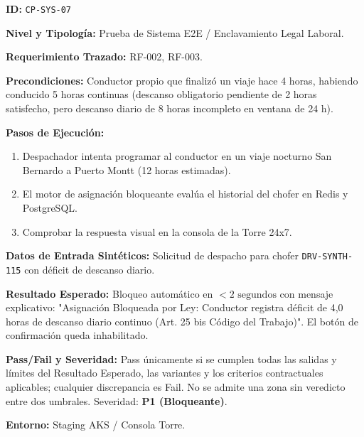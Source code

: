 \par\noindent\textbf{ID:} \texttt{C\allowbreak{}P\allowbreak{}-\allowbreak{}S\allowbreak{}Y\allowbreak{}S\allowbreak{}-\allowbreak{}0\allowbreak{}7\allowbreak{}}\par
\par\noindent\textbf{Nivel y Tipología:} Prueba de Sistema E2E / Enclavamiento Legal Laboral.\par
\par\noindent\textbf{Requerimiento Trazado:} RF-002, RF-003.\par
\par\noindent\textbf{Precondiciones:} Conductor propio que finalizó un viaje hace 4 horas, habiendo conducido 5 horas continuas (descanso obligatorio pendiente de 2 horas satisfecho, pero descanso diario de 8 horas incompleto en ventana de 24 h).\par
\par\noindent\textbf{Pasos de Ejecución:} \par
\begin{enumerate}
\item Despachador intenta programar al conductor en un viaje nocturno San Bernardo a Puerto Montt (12 horas estimadas).
\item El motor de asignación bloqueante evalúa el historial del chofer en Redis y PostgreSQL.
\item Comprobar la respuesta visual en la consola de la Torre 24x7.
\end{enumerate}
\par\noindent\textbf{Datos de Entrada Sintéticos:} Solicitud de despacho para chofer \texttt{D\allowbreak{}R\allowbreak{}V\allowbreak{}-\allowbreak{}S\allowbreak{}Y\allowbreak{}N\allowbreak{}T\allowbreak{}H\allowbreak{}-\allowbreak{}1\allowbreak{}1\allowbreak{}5\allowbreak{}} con déficit de descanso diario.\par
\par\noindent\textbf{Resultado Esperado:} Bloqueo automático en \(< 2\text{ segundos}\) con mensaje explicativo: "Asignación Bloqueada por Ley: Conductor registra déficit de 4,0 horas de descanso diario continuo (Art. 25 bis Código del Trabajo)". El botón de confirmación queda inhabilitado.\par
\par\noindent\textbf{Pass/Fail y Severidad:} Pass únicamente si se cumplen todas las salidas y límites del Resultado Esperado, las variantes y los criterios contractuales aplicables; cualquier discrepancia es Fail. No se admite una zona sin veredicto entre dos umbrales. Severidad: \textbf{P1 (Bloqueante)}.\par
\par\noindent\textbf{Entorno:} Staging AKS / Consola Torre.\par






